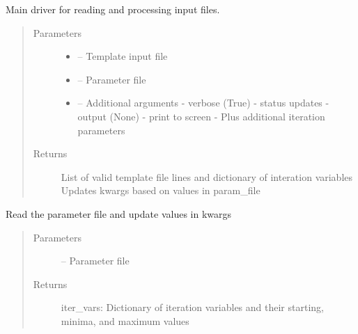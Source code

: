 \documentclass[letterpaper,10pt,english]{sphinxmanual}
\begin{document}
\begin{fulllineitems}
\label{\detokenize{readinputs:critops.readinputs.readmain}}
Main driver for reading and processing input files.
\begin{quote}\begin{description}
\item[{Parameters}] \leavevmode\begin{itemize}
\item {} 
 -- Template input file

\item {} 
 -- Parameter file

\item {} 
 -- Additional arguments
- verbose (True) - status updates
- output (None) - print to screen
- Plus additional iteration parameters

\end{itemize}

\item[{Returns}] \leavevmode
List of valid template file lines and dictionary of interation variables
Updates kwargs based on values in param\_file

\end{description}\end{quote}

\end{fulllineitems}


\begin{fulllineitems}
\label{\detokenize{readinputs:critops.readinputs.read_param}}
Read the parameter file and update values in kwargs
\begin{quote}\begin{description}
\item[{Parameters}] \leavevmode
{} -- Parameter file

\item[{Returns}] \leavevmode
iter\_vars: Dictionary of iteration variables and their starting, minima, and maximum values

\end{description}\end{quote}

\end{fulllineitems}
\end{document}

